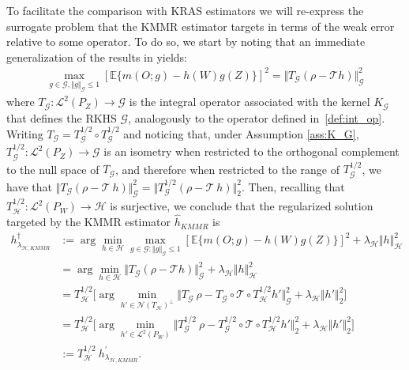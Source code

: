 \documentclass[twoside,11pt]{article}
\newcommand{\E}{\mathbb{E}}
\newcommand{\mc}{\mathcal}
\begin{document}
To facilitate the comparison with KRAS estimators we will re-express the surrogate problem that the KMMR estimator targets in terms of the weak error relative to some operator. To do so, we start by noting that an immediate generalization of the results in \cite{zhang2023instrumental} yields:
\begin{align*}
\max_{g\in\mc{G},\Vert g\Vert_\mc{G}\le1}\left[\E\{m(O;g)-h(W)g(Z)\}\right]^2 = \Vert T_\mc{G} \left(\rho-\mc{T} h\right)\Vert^2_\mc{G}
\end{align*}
where $T_{\mc{G}}:\mc{L}^2(P_Z) \rightarrow \mc{G}$ is the integral operator associated with the kernel $K_{\mc{G}}$ that defines the RKHS $\mc{G}$, analogously to the operator defined in~\eqref{def:int_op}. Writing $T_{\mc{G}}=T_{\mc{G}}^{1/2} \circ T_{\mc{G}}^{1/2}$ and noticing that, under Assumption \ref{ass:K_G}, $T_{\mc{G}}^{1/2}:\mc{L}^2(P_Z) \rightarrow \mc{G}$ is an isometry when restricted to the orthogonal complement to the null space of $T_\mc{G}$, and therefore when restricted to the range of $T_\mc{G}^{1/2}$, we have that $\Vert T_\mc{G} \left(\rho-\mc{T} \: h\right)\Vert^2_\mc{G}=\Vert T_\mc{G}^{1/2} \left(\rho-\mc{T} \:h\right)\Vert^2_2 $. Then, recalling that $T_\mc{H}^{1/2}:\mc{L}^2(P_W) \rightarrow \mc{H}$ is surjective, we conclude that the regularized solution targeted by the KMMR estimator $\hat{h}_{KMMR}$ is
\begin{align}
h_{\lambda_{\mc{H},KMMR}}^\dag&:=\arg\min_{h\in\mc{H}}\max_{g\in\mc{G}: \Vert g \Vert_{\mc{G}}\le1}\left[\mathbb{E}\{m(O;g)-h(W)g(Z)\}\right]^2+\lambda_\mc{H}\Vert h\Vert_{\mc{H}}^2 \nonumber
\\
&=\arg\min_{h\in\mc{H}}\Vert T_\mc{G} \left(\rho-\mc{T} h\right)\Vert^2_\mc{G}+\lambda_\mc{H}\Vert h\Vert_{\mc{H}}^2 \label{eqn:KMMR-surrogate-standard}
\\
&= T_\mc{H}^{1/2} \Big[ \arg\min_{h'\in\mc{N}(T_\mc{H})^\perp}\Vert T_\mc{G}\: \rho-T_\mc{G} \circ \mc{T} \circ  T_\mc{H}^{1/2} h'\Vert_\mc{G}^2+\lambda_\mc{H}\Vert h'\Vert_2^2 \Big] \nonumber 
\\
&= T_\mc{H}^{1/2} \Big[ \arg\min_{h'\in\mc{L}^2(P_W)}\Vert T_\mc{G}^{1/2}\: \rho-T_\mc{G}^{1/2} \circ \mc{T} \circ  T_\mc{H}^{1/2} h'\Vert_2^2+\lambda_\mc{H}\Vert h'\Vert_2^2 \Big] \label{eqn:KMMR-surrogate-transformed}
\\
&:= T_\mc{H}^{1/2} \: h_{\lambda_{\mc{H},KMMR}}^{'}. \nonumber
\end{align}
\end{document}
